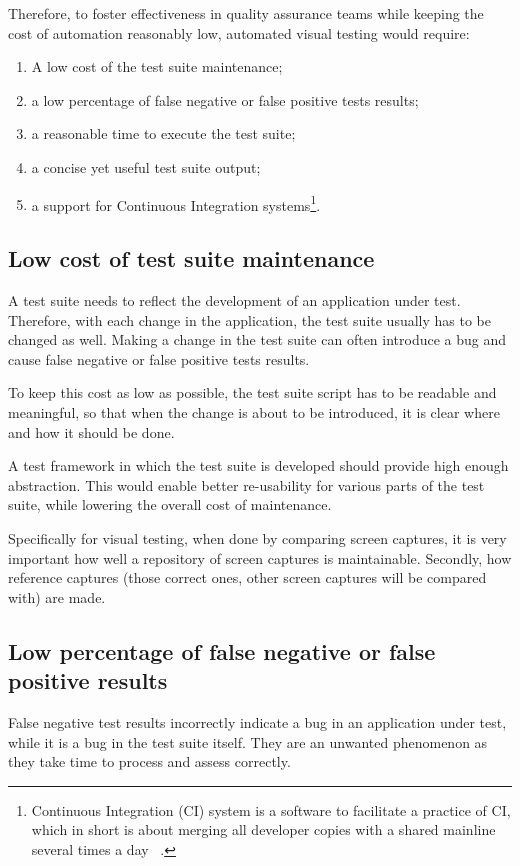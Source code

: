 \documentclass[11pt,oneside,final]{fithesis2}
\begin{document}
  Therefore, to foster effectiveness in quality assurance teams while keeping the cost of automation reasonably low, automated visual testing would require:
  \begin{enumerate}
   \item A low cost of the test suite maintenance;
   \item a low percentage of false negative or false positive tests results;
   \item a reasonable time to execute the test suite;
   \item a concise yet useful test suite output;
   \item a support for Continuous Integration systems\footnote{Continuous Integration (CI) system is a software to facilitate a practice of CI, which in short is about merging 
	  all developer copies with a shared mainline several times a day ~\citep{ci}.}.
  \end{enumerate}
  
    \subsection{Low cost of test suite maintenance}
    A test suite needs to reflect the development of an application under test. Therefore, with each change in the application, the test suite usually has to be changed as well.
    Making a change in the test suite can often introduce a bug and cause false negative or false positive tests results.
    
    To keep this cost as low as possible, the test suite script has to be readable and meaningful, so that when the change is about to be introduced, it is clear where and how it should be done.
    
    A test framework in which the test suite is developed should provide high enough abstraction. This would enable better re-usability for various parts of the test suite, 
    while lowering the overall cost of maintenance.
    
    Specifically for visual testing, when done by comparing screen captures, it is very important how well a repository of screen captures is maintainable. Secondly, 
    how reference captures (those correct ones, other screen captures will be compared with) are made.
    
    \subsection{Low percentage of false negative or false positive results}
    False negative test results incorrectly indicate a bug in an application under test, while it is a bug in the test suite itself. They are an unwanted phenomenon as they take time to process
    and assess correctly.
    
\end{document}
